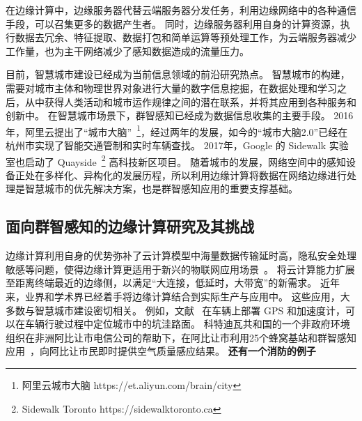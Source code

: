 在边缘计算中，边缘服务器代替云端服务器分发任务，利用边缘网络中的各种通信手段，可以召集更多的数据产生者。
同时，边缘服务器利用自身的计算资源，执行数据去冗余、特征提取、数据打包和简单运算等预处理工作，为云端服务器减少工作量，也为主干网络减少了感知数据造成的流量压力。


目前，智慧城市建设已经成为当前信息领域的前沿研究热点。
智慧城市的构建，需要对城市主体和物理世界对象进行大量的数字信息挖掘，在数据处理和学习之后，从中获得人类活动和城市运作规律之间的潜在联系，并将其应用到各种服务和创新中。
在智慧城市场景下，群智感知已经成为数据信息收集的主要手段。
2016年，阿里云提出了“城市大脑”~\footnote{阿里云城市大脑 https://et.aliyun.com/brain/city}，经过两年的发展，如今的“城市大脑2.0”已经在杭州市实现了智能交通管制和实时车辆查找。
2017年，Google 的 Sidewalk 实验室也启动了 Quayside~\footnote{Sidewalk Toronto https://sidewalktoronto.ca} 高科技新区项目。
随着城市的发展，网络空间中的感知设备正处在多样化、异构化的发展历程，所以利用边缘计算将数据在网络边缘进行处理是智慧城市的优先解决方案，也是群智感知应用的重要支撑基础。

\subsection{面向群智感知的边缘计算研究及其挑战}


边缘计算利用自身的优势弥补了云计算模型中海量数据传输延时高，隐私安全处理敏感等问题，使得边缘计算更适用于新兴的物联网应用场景~\cite{DBLP:journals/cm/SunA16}。
将云计算能力扩展至距离终端最近的边缘侧，以满足“大连接，低延时，大带宽”的新需求。
近年来，业界和学术界已经着手将边缘计算结合到实际生产与应用中。
这些应用，大多数与智慧城市建设密切相关。
例如，文献~\cite{DBLP:journals/cm/GantiYL11} 在车辆上部署 GPS 和加速度计，可以在车辆行驶过程中定位城市中的坑洼路面。
科特迪瓦共和国的一个非政府环境组织在非洲阿比让市电信公司的帮助下，在阿比让市利用25个蜂窝基站和群智感知应用~\cite{DBLP:conf/huc/ZhangXWC14}，向阿比让市民即时提供空气质量感应结果。
\textbf{还有一个消防的例子}

